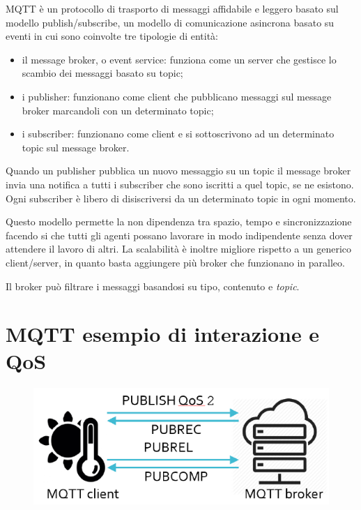 MQTT è un protocollo di trasporto di messaggi affidabile e leggero basato sul modello publish/subscribe, un modello di comunicazione asincrona basato su eventi in cui sono coinvolte tre tipologie di entità: 

\begin{itemize}
\item il message broker, o event service: funziona come un server che gestisce lo scambio dei messaggi basato su topic;
\item i publisher: funzionano come client che pubblicano messaggi sul message broker marcandoli con un determinato topic;
\item i subscriber: funzionano come client e si sottoscrivono ad un determinato topic sul message broker.
\end{itemize}

Quando un publisher pubblica un nuovo messaggio su un topic il message broker invia una notifica a tutti i subscriber che sono iscritti a quel topic, se ne esistono. Ogni subscriber è libero di disiscriversi da un determinato topic in ogni momento.

Questo modello permette la non dipendenza tra spazio, tempo e sincronizzazione facendo si che tutti gli agenti possano lavorare in modo indipendente senza dover attendere il lavoro di altri. La scalabilità è inoltre migliore rispetto a un generico client/server, in quanto basta aggiungere più broker che funzionano in paralleo.

Il broker può filtrare i messaggi basandosi su tipo, contenuto e \textit{topic}.

\section{MQTT esempio di interazione e QoS}

\begin{figure}[htbp]
   \centering
   \includegraphics{images/questions/Schermata del 2023-10-19 15-29-05.png}
   \label{fig:dom4}
\end{figure}

